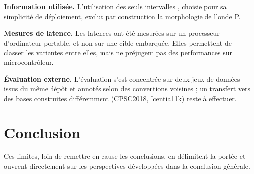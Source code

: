 \textbf{Information utilisée.} L'utilisation des seuls intervalles \RR{}, choisie pour sa simplicité de déploiement, exclut par construction la morphologie de l'onde P.

\textbf{Mesures de latence.} Les latences ont été mesurées sur un processeur d'ordinateur portable, et non sur une cible embarquée. Elles permettent de classer les variantes entre elles, mais ne préjugent pas des performances sur microcontrôleur.

\textbf{Évaluation externe.} L'évaluation s'est concentrée sur deux jeux de données issus du même dépôt et annotés selon des conventions voisines ; un transfert vers des bases construites différemment (CPSC2018, Icentia11k) reste à effectuer.

\section{Conclusion}
\label{sec:disc:conclusion}
Ces limites, loin de remettre en cause les conclusions, en délimitent la portée et ouvrent directement sur les perspectives développées dans la conclusion générale.
